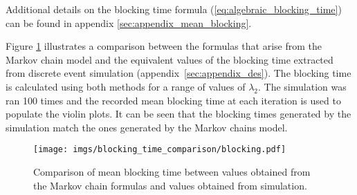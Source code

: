 Additional details on the blocking time formula 
(\ref{eq:algebraic_blocking_time}) can be found in appendix 
\ref{sec:appendix_mean_blocking}. 

Figure \ref{fig:markov_vs_des_blocking_time_comparison} illustrates a comparison 
between the formulas that arise from the Markov chain model and the equivalent 
values of the blocking time extracted from discrete event simulation
(appendix~\ref{sec:appendix_des}).
The blocking time is calculated using both methods for a range of values of
\(\lambda_2\).
The simulation was ran 100 times and the recorded mean blocking time at each 
iteration is used to populate the violin plots.
It can be seen that the blocking times generated by the simulation match the
ones generated by the Markov chains model.

\begin{figure}[H]
    \centering
    \texttt{[image: imgs/blocking\_time\_comparison/blocking.pdf]}
    \caption{
        Comparison of mean blocking time between values obtained from the 
        Markov chain formulas and values obtained from simulation.
    }
    \label{fig:markov_vs_des_blocking_time_comparison}
\end{figure}
